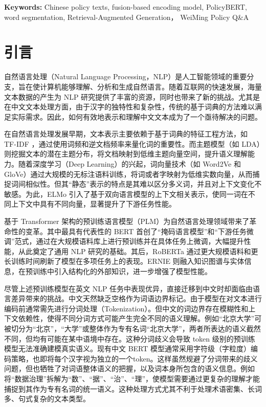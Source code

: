 \documentclass[12pt, a4paper]{ctexart}
\begin{document}
\vspace{2em} %

\textbf{Keywords:} Chinese policy texts, fusion-based encoding model, PolicyBERT, word segmentation, Retrieval-Augmented Generation， WeiMing Policy Q\&A

\newpage
\renewcommand{\cfttoctitlefont}{\hfill\Huge\bfseries} %
\renewcommand{\cftaftertoctitle}{\hfill} %
\tableofcontents %
\thispagestyle{fancy}
\newpage


\section{引言}
自然语言处理（Natural Language Processing，NLP）是人工智能领域的重要分支，旨在使计算机能够理解、分析和生成自然语言。随着互联网的快速发展，海量文本数据的产生为 NLP 研究提供了丰富的资源，同时也带来了新的挑战。尤其是在中文文本处理方面，由于汉字的独特性和复杂性，传统的基于词典的方法难以满足实际需求。因此，如何有效地表示和理解中文文本成为了一个亟待解决的问题。

在自然语言处理发展早期，文本表示主要依赖于基于词典的特征工程方法，如 TF-IDF ，通过使用词频和逆文档频率来量化词的重要性\cite{SALTON1988513}。而主题模型（如 LDA）则挖掘文本的潜在主题分布，将文档映射到低维主题向量空间，提升语义理解能力\cite{10.5555/944919.944937}。随着深度学习（Deep Learning）的兴起，词向量技术（如 Word2Ve\cite{mikolov2013efficientestimationwordrepresentations} 和 GloVe\cite{pennington-etal-2014-glove}）通过大规模的无标注语料训练，将词或者字映射为低维实数向量，从而捕捉词间相似性。但其“静态”表示的特点是其难以区分多义词，并且对上下文变化不敏感。为此，ELMo 引入了基于双向语言模型的上下文相关表示，使同一词在不同上下文中具有不同向量，显著提升了下游任务性能\cite{peters-etal-2018-deep}。

基于 Transformer 架构的预训练语言模型（PLM）为自然语言处理领域带来了革命性的变革。其中最具有代表性的 BERT 首创了“掩码语言模型”和“下游任务微调”范式，通过在大规模语料库上进行预训练并在具体任务上微调，大幅提升性能，从此奠定了通用 NLP 研究的基础\cite{devlin-etal-2019-bert}。其后，RoBERTa 通过更大规模语料和更长训练时间刷新了模型在多项任务上的表现\cite{liu2019robertarobustlyoptimizedbert}。ERNIE 则融入知识图谱与实体信息，在预训练中引入结构化的外部知识，进一步增强了模型性能\cite{sun2019ernieenhancedrepresentationknowledge}。

尽管上述预训练模型在英文 NLP 任务中表现优异，直接迁移到中文时却面临由语言差异带来的挑战。中文天然缺乏空格作为词语边界标记。由于模型在对文本进行编码前通常需先进行分词处理（Tokenization）。但中文的词边界存在模糊性和上下文依赖性，使得不同分词方式可能产生完全不同的语义理解。例如“北京大学”可被切分为“北京”，“大学”或整体作为专有名词“北京大学”，两者所表达的语义截然不同，但均有可能在某中语境中存在。这种分词歧义会导致 token 级别的预训练模型无法准确建模真实语义。现有中文 BERT 模型通常采用字符级（字粒度）编码策略，也即将每个汉字视为独立的一个token。这样虽然规避了分词带来的歧义问题，但也牺牲了对词语整体语义的把握，以及词本身所包含的语义信息。例如将“数据治理”拆解为“数”、“据”、“治”、“理”，使模型需要通过更复杂的理解才能捕捉到其作为专有名词的统一语义。这种处理方式尤其不利于处理术语密集、长词多、句式复杂的文本类型。
\end{document}
